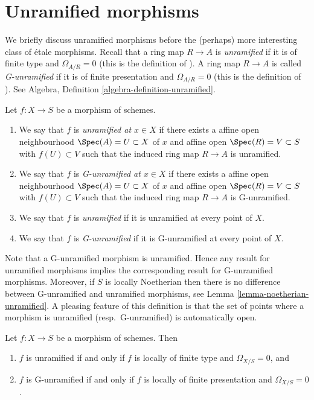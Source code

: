 \section{Unramified morphisms}
\label{section-unramified}

\noindent
We briefly discuss unramified morphisms before the (perhaps) more interesting
class of \'etale morphisms. Recall that a ring map $R \to A$ is {\it unramified}
if it is of finite type and $\Omega_{A/R} = 0$ (this is the definition
of \cite{Henselian}). A ring map $R \to A$ is called {\it G-unramified} if it
is of finite presentation and $\Omega_{A/R} = 0$ (this is the definition of
\cite{EGA}). See
Algebra, Definition \ref{algebra-definition-unramified}.

\begin{definition}
\label{definition-unramified}
Let $f : X \to S$ be a morphism of schemes.
\begin{enumerate}
\item We say that $f$ is {\it unramified at $x \in X$} if
there exists a affine open neighbourhood $\Spec(A) = U \subset X$
of $x$ and affine open $\Spec(R) = V \subset S$
with $f(U) \subset V$ such that the induced ring map
$R \to A$ is unramified.
\item We say that $f$ is {\it G-unramified at $x \in X$} if
there exists a affine open neighbourhood $\Spec(A) = U \subset X$
of $x$ and affine open $\Spec(R) = V \subset S$
with $f(U) \subset V$ such that the induced ring map
$R \to A$ is G-unramified.
\item We say that $f$ is {\it unramified} if it is unramified
at every point of $X$.
\item We say that $f$ is {\it G-unramified} if it is G-unramified
at every point of $X$.
\end{enumerate}
\end{definition}

\noindent
Note that a G-unramified morphism is unramified. Hence any result for
unramified morphisms implies the corresponding result for G-unramified
morphisms. Moreover, if $S$ is locally Noetherian then there is no difference
between G-unramified and unramified morphisms, see
Lemma \ref{lemma-noetherian-unramified}.
A pleasing feature of this definition is that the set of points
where a morphism is unramified (resp.\ G-unramified) is automatically open.

\begin{lemma}
\label{lemma-unramified-omega-zero}
Let $f : X \to S$ be a morphism of schemes. Then
\begin{enumerate}
\item $f$ is unramified if and only if $f$ is locally of finite type
and $\Omega_{X/S} = 0$, and
\item $f$ is G-unramified if and only if $f$ is locally of finite presentation
and $\Omega_{X/S} = 0$.
\end{enumerate}
\end{lemma}

